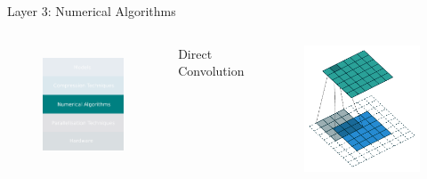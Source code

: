 \documentclass[xcolor=dvipsnames]{beamer}
\begin{document}
\begin{frame}{Layer 3: Numerical Algorithms}

\begin{columns}

\begin{figure}
    \centering
    \includegraphics[width=3.5cm]{images/numericals.pdf}
    \label{fig:inference-stack-nums-1}
\end{figure}


{\large Direct Convolution}

\begin{figure}
    \centering
    \includegraphics[width=5cm]{images/arbitrary_padding_no_strides_01.pdf}
\end{figure}

\end{columns}
\end{frame}
\end{document}
